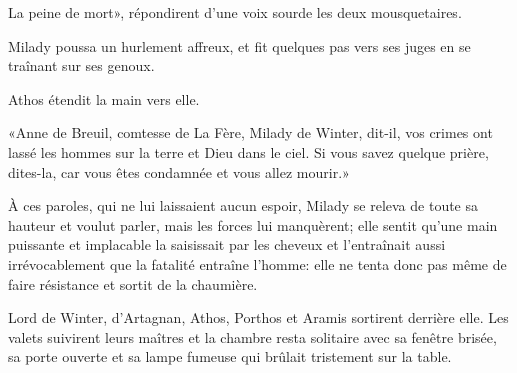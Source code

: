 \speak  La peine de mort», répondirent d'une voix sourde les deux mousquetaires. 

Milady poussa un hurlement affreux, et fit quelques pas vers ses juges en se traînant sur ses genoux. 

Athos étendit la main vers elle. 

«Anne de Breuil, comtesse de La Fère, Milady de Winter, dit-il, vos crimes ont lassé les hommes sur la terre et Dieu dans le ciel. Si vous savez quelque prière, dites-la, car vous êtes condamnée et vous allez mourir.» 

À ces paroles, qui ne lui laissaient aucun espoir, Milady se releva de toute sa hauteur et voulut parler, mais les forces lui manquèrent; elle sentit qu'une main puissante et implacable la saisissait par les cheveux et l'entraînait aussi irrévocablement que la fatalité entraîne l'homme: elle ne tenta donc pas même de faire résistance et sortit de la chaumière. 

Lord de Winter, d'Artagnan, Athos, Porthos et Aramis sortirent derrière elle. Les valets suivirent leurs maîtres et la chambre resta solitaire avec sa fenêtre brisée, sa porte ouverte et sa lampe fumeuse qui brûlait tristement sur la table. 
